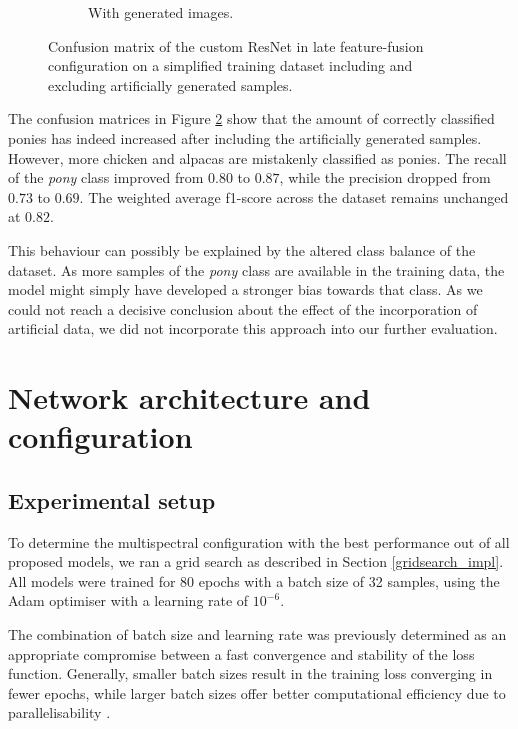\documentclass{l4proj}
\begin{document}
\begin{figure}[ht]
\begin{subfigure}[h!]{0.3\textwidth}
    \caption{With generated images.}
    \label{fig:auto_confusion_auto}
  \end{subfigure}
  \caption{Confusion matrix of the custom ResNet in late feature-fusion configuration on a simplified training dataset including and excluding artificially generated samples.}
  \label{fig:auto_confusion}
\end{figure}

The confusion matrices in Figure \ref{fig:auto_confusion} show that the amount of correctly classified ponies has indeed increased after including the artificially generated samples. However, more chicken and alpacas are mistakenly classified as ponies. The recall of the \textit{pony} class improved from $0.80$ to $0.87$, while the precision dropped from $0.73$ to $0.69$. The weighted average f1-score across the dataset remains unchanged at $0.82$. 

This behaviour can possibly be explained by the altered class balance of the dataset. As more samples of the \textit{pony} class are available in the training data, the model might simply have developed a stronger bias towards that class. As we could not reach a decisive conclusion about the effect of the incorporation of artificial data, we did not incorporate this approach into our further evaluation.


\section{Network architecture and configuration}

\subsection{Experimental setup}

To determine the multispectral configuration with the best performance out of all proposed models, we ran a grid search as described in Section \ref{gridsearch_impl}. All models were trained for 80 epochs with a batch size of 32 samples, using the Adam optimiser with a learning rate of $10^{-6}$. 

The combination of batch size and learning rate was previously determined as an appropriate compromise between a fast convergence and stability of the loss function. Generally, smaller batch sizes result in the training loss converging in fewer epochs, while larger batch sizes offer better computational efficiency due to parallelisability \citep{devarakonda_adabatch_2018}. 
\end{document}
